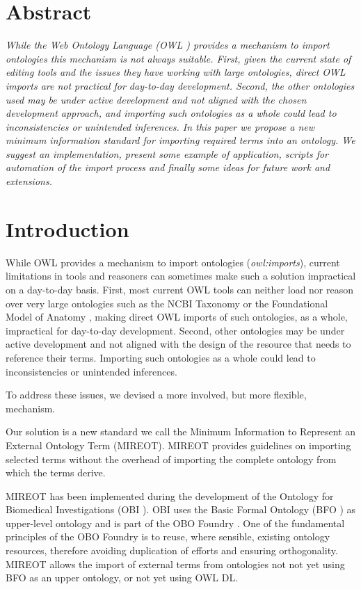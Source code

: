 \documentclass{elsart3p}    %
\begin{document}
\section*{Abstract}
\emph{
While the Web Ontology Language (OWL \cite{RefWorks:1506}) provides a mechanism to import ontologies this mechanism is not always suitable.
First, given the current state of editing tools and the issues they have working with large ontologies, direct OWL imports are not practical for day-to-day development.
Second, the other ontologies used may be under active development and not aligned with the chosen development approach, and importing such ontologies as a whole could lead to inconsistencies or unintended inferences.
In this paper we propose a new minimum information standard for importing required terms into an ontology. 
We suggest an implementation, present some example of application, scripts for automation of the import process and finally some ideas for future work and extensions.}



\section*{Introduction}
\label{intro}
While OWL provides a mechanism to import ontologies (\emph{owl:imports}), current limitations in tools and reasoners can sometimes make such a solution impractical on a day-to-day basis.
First, most current OWL tools can neither load nor reason over very large ontologies such as the NCBI Taxonomy \cite{RefWorks:1502} or the Foundational Model of Anatomy \cite{RefWorks:1558}, making direct OWL imports of such ontologies, as a whole, impractical for day-to-day development. 
Second, other ontologies may be under active development and not aligned with the design of the resource that needs to reference their terms. 
Importing such ontologies as a whole could lead to inconsistencies or unintended inferences.

To address these issues, we devised a more involved, but more flexible, mechanism.

Our solution is a new standard we call the Minimum Information to Represent an External Ontology Term (MIREOT).
MIREOT provides guidelines on importing selected terms without the overhead of importing the complete ontology from which the terms derive. 

MIREOT has been implemented during the development of the Ontology for Biomedical Investigations (OBI  \cite{RefWorks:1507}).
OBI uses the Basic Formal Ontology (BFO \cite{RefWorks:1557}) as upper-level ontology and is part of the OBO Foundry \cite{RefWorks:1472}. 
One of the fundamental principles of the OBO Foundry is to reuse, where sensible, existing ontology resources, therefore avoiding duplication of efforts and ensuring orthogonality.
MIREOT allows the import of external terms from ontologies not not yet using BFO as an upper ontology, or not yet using OWL DL.
\end{document}
